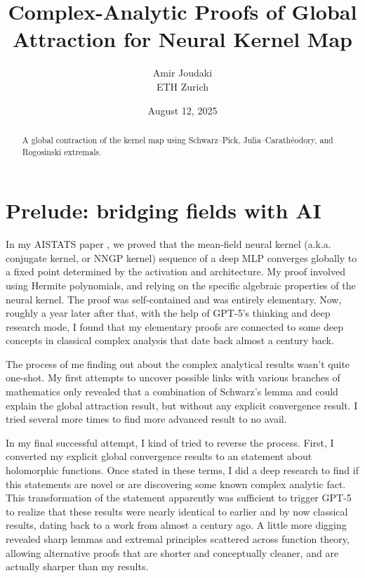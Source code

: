 \documentclass[11pt]{article}
\title{Complex-Analytic Proofs of Global Attraction for Neural Kernel Map}
\author{Amir Joudaki\\ETH Zurich}
\date{August 12, 2025}
\begin{document}
\maketitle

\begin{abstract}
A global contraction of the kernel map using Schwarz–Pick, Julia–Carathéodory, and Rogosinski extremals.
\end{abstract}


\section{Prelude: bridging fields with AI}

In my AISTATS paper \cite{joudaki2025aistats}, we proved that the mean-field neural kernel (a.k.a. conjugate kernel, or NNGP kernel) sequence of a deep MLP converges globally to a fixed point determined by the activation and architecture. My proof involved using Hermite polynomials, and relying on the specific algebraic properties of the neural kernel. The proof was self-contained and was entirely elementary. 
Now, roughly a year later after that, with the help of GPT-5's thinking and deep research mode, I found that my elementary proofs are connected to some deep concepts in classical complex analysis that date back almost a century back. 

The process of me finding out about the complex analytical results wasn't quite one-shot. My first attempts to uncover possible links with various branches of mathematics only revealed that a combination of Schwarz's lemma and could explain the global attraction result, but without any explicit convergence result. I tried several more times to find more advanced result to no avail. 

In my final successful attempt, I kind of tried to reverse the process. First, I converted my explicit global convergence results to an statement about holomorphic functions. Once stated in these terms, I did a deep research to find if this statements are novel or are discovering some known complex analytic fact. This transformation of the statement apparently was sufficient to trigger GPT-5 to realize that these results were nearly identical to earlier and by now classical results, dating back to a work from almost a century ago. A little more digging revealed sharp lemmas and extremal principles scattered across function theory, allowing alternative proofs that are shorter and conceptually cleaner, and are actually sharper than my results.
\end{document}
